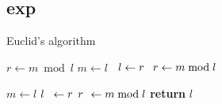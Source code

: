 \documentclass{article}
\begin{document}
\begin{CJK}{UTF8}{gbsn}
	

	
\section{exp}

\begin{algorithm}
	\caption{Euclid's algorithm}
	\begin{algorithmic}[1]
		\State $r\gets m\bmod l$
		\State $m \gets l$
		\State $\hphantom{m}\mathllap{l} \gets r$
		\State $\hphantom{m}\mathllap{r} \gets m\bmod l$
		
		
		
		\EndWhile
		\State $m \gets l$
		\State $\mathrlap{l}\hphantom{m} \gets r$
		\State $\mathrlap{r}\hphantom{m} \gets m\bmod l$
		\EndWhile
		\State \textbf{return} $l$
		\EndProcedure
	\end{algorithmic}
\end{algorithm}
	


\end{CJK}
\end{document}
